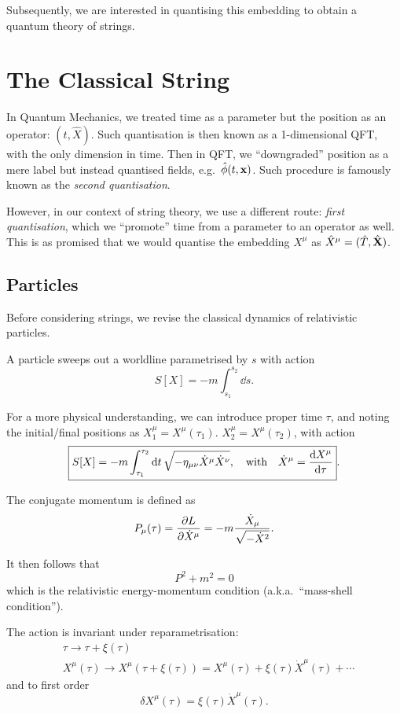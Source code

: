 \documentclass[a4paper,11pt]{article}
\begin{document}

	Subsequently, we are interested in quantising this embedding to obtain a quantum theory of strings.

	\newpage 

	\section{The Classical String} 

	In Quantum Mechanics, we treated time as a parameter but the position as an operator: $(t, \hat X)$. Such quantisation is then known as a 1-dimensional QFT, with the only dimension in time. Then in QFT, we ``downgraded'' position as a mere label but instead quantised fields, e.g.\ $\hat \phi(t,\vb x)$. Such procedure is famously known as the \emph{second quantisation}.

	However, in our context of string theory, we use a different route: \emph{first quantisation}, which we ``promote'' time from a parameter to an operator as well. This is as promised that we would quantise the embedding $X^\mu$ as $\hat X^\mu = (\hat T, \hat{\vb X})$.

	\subsection{Particles}

	Before considering strings, we revise the classical dynamics of relativistic particles.

	A particle sweeps out a worldline parametrised by $s$ with action 
	\[
		S[X] = - m \int_{s_1}^{s_2} \dd{s}.
	\]

	For a more physical understanding, we can introduce proper time $\tau$, and noting the initial/final positions as $X_1^\mu = X^\mu(\tau_1)$. $X_2^\mu = X^\mu (\tau_2)$, with action 
	\[
		\boxed{S[X] = - m \int_{\tau_1}^{\tau_2} \dd{t} \sqrt{ - \eta _{\mu \nu} \dot X^\mu \dot X^\nu}, \quad \text{with}\quad \dot X^\mu = \dv{X^\mu}{\tau}} .
	\]
	
	The conjugate momentum is defined as 
	\[
		P_\mu (\tau) = \pdv{L}{\dot X^\mu} = - m \frac{\dot X_\mu}{\sqrt{- \dot X^2}}.
	\]

	It then follows that 
	\[
		P^2 + m^2 = 0
	\]
	which is the relativistic energy-momentum condition (a.k.a.\ ``mass-shell condition'').

	The action is invariant under reparametrisation:
	\begin{align*}
		& \tau \to \tau + \xi(\tau)\\
		& X^\mu (\tau) \to X^\mu(\tau + \xi(\tau)) = X^\mu(\tau) + \xi(\tau) \dot X^\mu(\tau) + \cdots
	\end{align*}
	and to first order 
	\[
		\delta X^\mu(\tau) = \xi(\tau) \dot X^\mu(\tau).
	\]
	
\end{document}

